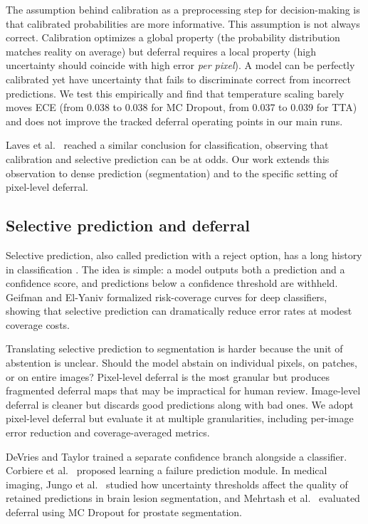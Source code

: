 The assumption behind calibration as a preprocessing step for decision-making
is that calibrated probabilities are more informative. This assumption is not
always correct. Calibration optimizes a global property (the probability
distribution matches reality on average) but deferral requires a local
property (high uncertainty should coincide with high error \emph{per pixel}).
A model can be perfectly calibrated yet have uncertainty that fails to
discriminate correct from incorrect predictions. We test this empirically
and find that temperature scaling barely moves ECE (from 0.038 to 0.038 for
MC Dropout, from 0.037 to 0.039 for TTA) and does not improve the tracked
deferral operating points in our main runs.

Laves et al.\ \citep{laves2020well} reached a similar conclusion for
classification, observing that calibration and selective prediction can be
at odds. Our work extends this observation to dense prediction (segmentation)
and to the specific setting of pixel-level deferral.

\subsection{Selective prediction and deferral}

Selective prediction, also called prediction with a reject option, has a long
history in classification \citep{chow1970optimum,el2010foundations}. The idea
is simple: a model outputs both a prediction and a confidence score, and
predictions below a confidence threshold are withheld. Geifman and El-Yaniv
\citep{geifman2017selective} formalized risk-coverage curves for deep
classifiers, showing that selective prediction can dramatically reduce error
rates at modest coverage costs.

Translating selective prediction to segmentation is harder because the unit
of abstention is unclear. Should the model abstain on individual pixels, on
patches, or on entire images? Pixel-level deferral is the most granular but
produces fragmented deferral maps that may be impractical for human review.
Image-level deferral is cleaner but discards good predictions along with
bad ones. We adopt pixel-level deferral but evaluate it at multiple
granularities, including per-image error reduction and coverage-averaged
metrics.

DeVries and Taylor \citep{devries2018learning} trained a separate confidence
branch alongside a classifier. Corbiere et al.\ \citep{corbiere2019addressing}
proposed learning a failure prediction module. In medical imaging, Jungo et al.\
\citep{jungo2020analyzing} studied how uncertainty thresholds affect the
quality of retained predictions in brain lesion segmentation, and
Mehrtash et al.\ \citep{mehrtash2020confidence} evaluated deferral using
MC Dropout for prostate segmentation.

